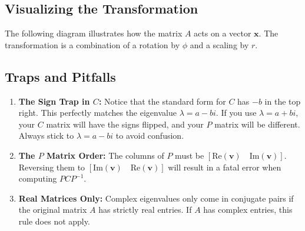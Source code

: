 \documentclass[11pt, letterpaper]{article}
\theoremstyle{definition}
\theoremstyle{remark}
\begin{document}
\subsection{Visualizing the Transformation}
The following diagram illustrates how the matrix $A$ acts on a vector $\mathbf{x}$. The transformation is a combination of a rotation by $\phi$ and a scaling by $r$.

\begin{center}
\end{center}

\subsection{Traps and Pitfalls}
\begin{enumerate}
    \item \textbf{The Sign Trap in $C$:} Notice that the standard form for $C$ has $-b$ in the top right. This perfectly matches the eigenvalue $\lambda = a - bi$. If you use $\lambda = a + bi$, your $C$ matrix will have the signs flipped, and your $P$ matrix will be different. Always stick to $\lambda = a - bi$ to avoid confusion.
    \item \textbf{The $P$ Matrix Order:} The columns of $P$ must be $[\text{Re}(\mathbf{v}) \quad \text{Im}(\mathbf{v})]$. Reversing them to $[\text{Im}(\mathbf{v}) \quad \text{Re}(\mathbf{v})]$ will result in a fatal error when computing $PCP^{-1}$.
    \item \textbf{Real Matrices Only:} Complex eigenvalues only come in conjugate pairs if the original matrix $A$ has strictly real entries. If $A$ has complex entries, this rule does not apply.
\end{enumerate}
\end{document}

